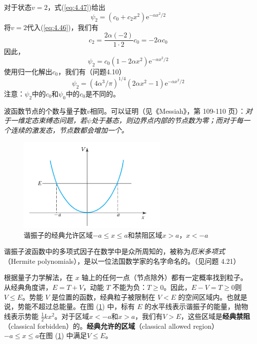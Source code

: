     对于状态$v=2$，式(\ref{eq:4.47})给出
    \begin{equation*}
        \psi_2 = \left(c_0 + c_2x^2\right)\mathrm{e}^{-\alpha x^2 / 2}
    \end{equation*}
    将$v=2$代入(\ref{eq:4.46})，我们有
    \begin{equation*}
        c_2 = \frac{2\alpha \left(-2\right)}{1\cdot2}c_0 = -2\alpha c_0
    \end{equation*}
    因此，
    \begin{equation}
        \psi_2 = c_0\left(1-2\alpha x^2\right)\mathrm{e}^{-\alpha x^2 / 2}
        \label{eq:4.56}
    \end{equation}
    使用归一化解出$c_0$，我们有（问题4.10）
    \begin{equation}
        \psi_2 = \left(4\alpha^3 / \pi\right)^{1/4}\left(2\alpha x^2 - 1\right)\mathrm{e}^{-\alpha x^2 / 2}
        \label{eq:4.57}
    \end{equation}
    注意：$\psi_2$中的$c_0$和$\psi_0$中的$c_0$是不同的。

    波函数节点的个数与量子数$v$相同。可以证明（见《Messiah》，第 109-110 页）：\textit{对于一维定态束缚态问题，若$\psi$处于基态，则边界点内部的节点数为零；而对于每一个连续的激发态，节点数都会增加一个。}
    \begin{figure}[ht]
        \centering
        \includegraphics[width=0.65\textwidth]{Figures/4.5.png}
        \caption{
            谐振子的经典允许区域$-a \le x \le a$和禁阻区域$x > a$，$x < -a$
        }
        \label{fig:4.5}
    \end{figure}

    谐振子波函数中的多项式因子在数学中是众所周知的，被称为\textit{厄米多项式}（Hermite polynomials），是以一位法国数学家的名字命名的。（见问题 4.21）

    根据量子力学解法，在 $x$ 轴上的任何一点（节点除外）都有一定概率找到粒子。从经典角度讲，$E=T+V$，动能 $T$ 不能为负：$T \ge 0$。因此，$E-V = T \ge 0$则$V \le E$。势能 $V$ 是位置的函数，经典粒子被限制在 $V<E$ 的空间区域内。也就是说，势能不超过总能量。在图 (\ref{fig:4.5}) 中，标有 $E$ 的水平线表示谐振子的能量，抛物线表示势能 $\frac{1}{2}kx^2$。对于区域$x < -a$和$x > a$，我们有$V>E$，这些区域是\textbf{经典禁阻}（classical forbidden）的。\textbf{经典允许的区域}（classical allowed region） $-a \le x \le a$在图 (\ref{fig:4.5}) 中满足$V\le E$。

